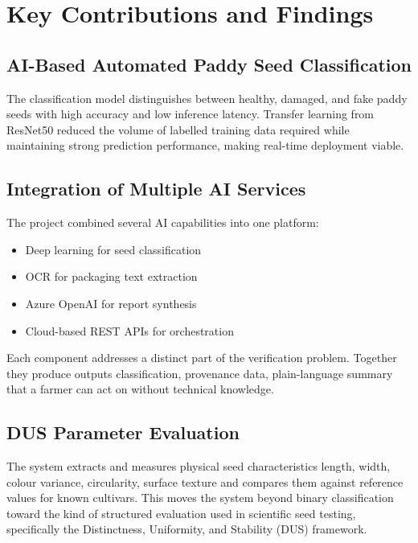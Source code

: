 \section{Key Contributions and Findings}

\subsection{AI-Based Automated Paddy Seed Classification}

The classification model distinguishes between healthy, damaged, and fake paddy seeds with high accuracy and low inference latency. Transfer learning from ResNet50 reduced the volume of labelled training data required while maintaining strong prediction performance, making real-time deployment viable.

\subsection{Integration of Multiple AI Services}

The project combined several AI capabilities into one platform:

\begin{itemize}
    \item Deep learning for seed classification
    \item OCR for packaging text extraction
    \item Azure OpenAI for report synthesis
    \item Cloud-based REST APIs for orchestration
\end{itemize}

Each component addresses a distinct part of the verification problem. Together they produce outputs classification, provenance data, plain-language summary that a farmer can act on without technical knowledge.

\subsection{DUS Parameter Evaluation}

The system extracts and measures physical seed characteristics length, width, colour variance, circularity, surface texture and compares them against reference values for known cultivars. This moves the system beyond binary classification toward the kind of structured evaluation used in scientific seed testing, specifically the Distinctness, Uniformity, and Stability (DUS) framework.

